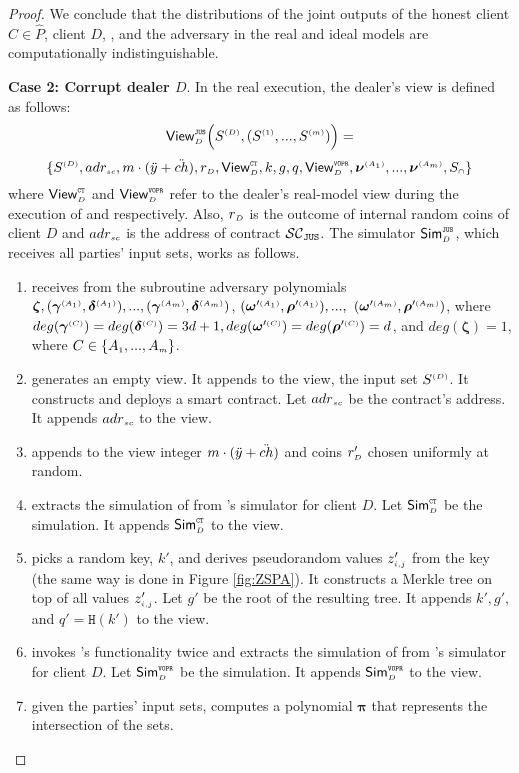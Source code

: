 \begin{proof}
We conclude that the distributions of the joint outputs of the honest client $C\in \hat P$, client $D$, \aud, and the adversary in the real and ideal models are computationally indistinguishable.



\noindent\textbf{Case 2: Corrupt dealer $D$}.  In the real execution, the dealer's view is defined as follows: 
%
$$ \mathsf{View}_{\scriptscriptstyle D}^{\scriptscriptstyle \mathtt{JUS}} \Big(S^{\scriptscriptstyle (D)},(S^{\scriptscriptstyle (1)},..., S^{\scriptscriptstyle (m)})\Big)=$$ $$ \{S^{\scriptscriptstyle (D)}, adr_{\scriptscriptstyle sc}, m\cdot(\ddot{y}+\ddot{ch}), r_{\scriptscriptstyle D}, \mathsf{View}^{\scriptscriptstyle \mathtt{CT}}_{\scriptscriptstyle D}, k, g, q, \mathsf{View}^{\scriptscriptstyle \mathtt{VOPR}}_{\scriptscriptstyle D}, \bm\nu^{\scriptscriptstyle (A_1)},..., \bm\nu^{\scriptscriptstyle (A_m)}, S_{\scriptscriptstyle \cap}\}$$
%
where  $\mathsf{View}^{\scriptscriptstyle \mathtt{CT}}_{\scriptscriptstyle D}$ and $\mathsf{View}^{\scriptscriptstyle \mathtt{VOPR}}_{\scriptscriptstyle D}$ refer to the dealer's real-model view during the execution of \ct and \vopr respectively. Also, $r_{\scriptscriptstyle D}$ is the outcome of internal random coins of client $D$ and $adr_{\scriptscriptstyle sc}$ is the address of contract $\mathcal{SC}_{\mathtt{JUS}}$. The simulator $\mathsf{Sim}^{\scriptscriptstyle \mathtt{JUS}}_{\scriptscriptstyle D}$, which receives all parties' input sets, works as follows. 

\begin{enumerate}

\item receives from the subroutine adversary polynomials $ {\bm\zeta}, ( {\bm\gamma}^{\scriptscriptstyle(A_1)},  {\bm\delta}^{\scriptscriptstyle (A_1)}),..., ( {\bm\gamma}^{\scriptscriptstyle(A_m)},  {\bm\delta}^{\scriptscriptstyle (A_m)})$,  $( {\bm\omega}'^{\scriptscriptstyle (A_1)},  {\bm\rho}'^{\scriptscriptstyle (A_1)}),..., $ $( {\bm\omega}'^{\scriptscriptstyle (A_m)},  {\bm\rho}'^{\scriptscriptstyle (A_m)})$, where $deg( {\bm\gamma}^{\scriptscriptstyle(C)})=deg( {\bm\delta}^{\scriptscriptstyle(C)})=3d+1, deg( {\bm\omega}'^{\scriptscriptstyle (C)}) =deg( {\bm\rho}'^{\scriptscriptstyle (C)})= d$, and $deg( {\bm\zeta})=1$, where $C\in  \{  {  A}_{ \scriptscriptstyle {   1}}, ...,   {  A}_{ \scriptscriptstyle {   m}}\} $.
%
\item generates an empty view. It appends to the view, the input set $S^{\scriptscriptstyle (D)}$. It constructs and deploys a smart contract. Let $  {adr}_{\scriptscriptstyle sc}$ be the contract's address. It appends $ {adr}_{\scriptscriptstyle sc}$ to the view. 


\item appends to the view integer $m\cdot(\ddot{y}+\ddot{ch})$   and coins $r'_{\scriptscriptstyle D}$ chosen uniformly at random. 
%
\item extracts the simulation of \ct from \ct's simulator for client $D$. Let $\mathsf{Sim}^{\scriptscriptstyle \mathtt{CT}}_{\scriptscriptstyle D}$ be the simulation. It appends $\mathsf{Sim}^{\scriptscriptstyle \mathtt{CT}}_{\scriptscriptstyle D}$ to the view. 
%
\item picks a random key, $  k'$, and derives pseudorandom values $z'_{\scriptscriptstyle i,j}$ from the key (the same way is done in Figure \ref{fig:ZSPA}). It constructs a Merkle tree on top of all values $z'_{\scriptscriptstyle i, j}$. Let $g'$ be the root of the resulting tree. It appends $  k', g'$, and $q'=\mathtt{H}(  k')$ to the view. 
%
\item invokes \vopr's functionality twice and extracts the simulation of \vopr from \vopr's simulator for client $D$. Let $\mathsf{Sim}^{\scriptscriptstyle \mathtt{VOPR}}_{\scriptscriptstyle D}$ be the simulation. It appends $\mathsf{Sim}^{\scriptscriptstyle \mathtt{VOPR}}_{\scriptscriptstyle D}$ to the view.  
%
\item given the parties' input sets, computes a polynomial $ {\bm\pi}$ that represents the intersection of the sets. 


\end{enumerate}
\end{proof}
